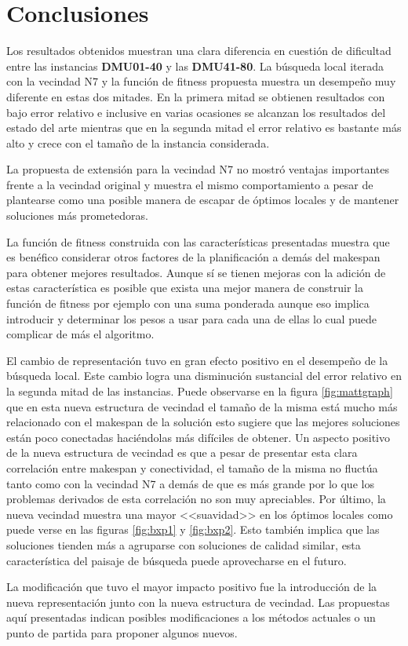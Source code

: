 \section{Conclusiones}
Los resultados obtenidos muestran una clara diferencia en cuestión de dificultad entre las instancias \textbf{DMU01-40} y las \textbf{DMU41-80}. La búsqueda local iterada con la vecindad N7 y la función de fitness propuesta muestra un desempeño muy diferente en estas dos mitades. En la primera mitad se obtienen resultados con bajo error relativo e inclusive en varias ocasiones se alcanzan los resultados del estado del arte mientras que en la segunda mitad el error relativo es bastante más alto y crece con el tamaño de la instancia considerada. 

La propuesta de extensión para la vecindad N7 no mostró ventajas importantes frente a la vecindad original y muestra el mismo comportamiento a pesar de plantearse como una posible manera de escapar de óptimos locales y de mantener soluciones más prometedoras. 

La función de fitness construida con las características presentadas muestra que es benéfico considerar otros factores de la planificación a demás del makespan para obtener mejores resultados. Aunque sí se tienen mejoras con la adición de estas característica es posible que exista una mejor manera de construir la función de fitness por ejemplo con una suma ponderada aunque eso implica introducir y determinar los pesos a usar para cada una de ellas lo cual puede complicar de más el algoritmo.

El cambio de representación tuvo en gran efecto positivo en el desempeño de la búsqueda local. Este cambio logra una disminución sustancial del error relativo en la segunda mitad de las instancias. Puede observarse en la figura \ref{fig:mattgraph} que en esta nueva estructura de vecindad el tamaño de la misma está mucho más relacionado con el makespan de la solución esto sugiere que las mejores soluciones están poco conectadas haciéndolas más difíciles de obtener. Un aspecto positivo de la nueva estructura de vecindad es que a pesar de presentar esta clara correlación entre makespan y conectividad, el tamaño de la misma no fluctúa tanto como con la vecindad N7 a demás de que es más grande por lo que los problemas derivados de esta correlación no son muy apreciables. Por último, la nueva vecindad muestra una mayor <<suavidad>> en los óptimos locales como puede verse en las figuras \ref{fig:bxp1} y \ref{fig:bxp2}. Esto también implica que las soluciones tienden más a agruparse con soluciones de calidad similar, esta característica del paisaje de búsqueda puede aprovecharse en el futuro.

La modificación que tuvo el mayor impacto positivo fue la introducción de la nueva representación junto con la nueva estructura de vecindad. Las propuestas aquí presentadas indican posibles modificaciones a los métodos actuales o un punto de partida para proponer algunos nuevos.
